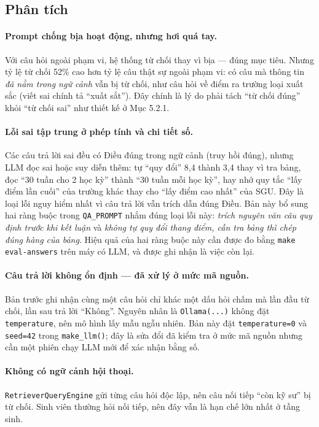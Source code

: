 \subsection{Phân tích}

\paragraph{Prompt chống bịa hoạt động, nhưng hơi quá tay.} Với câu hỏi ngoài phạm vi, hệ thống từ chối
thay vì bịa --- đúng mục tiêu. Nhưng tỷ lệ từ chối 52\% cao hơn tỷ lệ câu thật sự ngoài phạm vi: có
câu mà thông tin \emph{đã nằm trong ngữ cảnh} vẫn bị từ chối, như câu hỏi về điểm ra trường loại xuất
sắc (viết sai chính tả ``xuất sắt''). Đây chính là lý do phải tách ``từ chối đúng'' khỏi ``từ chối
sai'' như thiết kế ở Mục 5.2.1.

\paragraph{Lỗi sai tập trung ở phép tính và chi tiết số.} Các câu trả lời sai đều có Điều đúng trong
ngữ cảnh (truy hồi đúng), nhưng LLM đọc sai hoặc suy diễn thêm: tự ``quy đổi'' 8,4 thành 3,4 thay vì
tra bảng, đọc ``30 tuần cho 2 học kỳ'' thành ``30 tuần mỗi học kỳ'', hay nhớ quy tắc ``lấy điểm lần
cuối'' của trường khác thay cho ``lấy điểm cao nhất'' của SGU. Đây là loại lỗi nguy hiểm nhất vì câu
trả lời vẫn trích dẫn đúng Điều. Bản này bổ sung hai ràng buộc trong \texttt{QA\_PROMPT} nhắm đúng
loại lỗi này: \emph{trích nguyên văn câu quy định trước khi kết luận} và \emph{không tự quy đổi thang
điểm, cần tra bảng thì chép đúng hàng của bảng}. Hiệu quả của hai ràng buộc này cần được đo bằng
\texttt{make eval-answers} trên máy có LLM, và được ghi nhận là việc còn lại.

\paragraph{Câu trả lời không ổn định --- đã xử lý ở mức mã nguồn.} Bản trước ghi nhận cùng một câu hỏi
chỉ khác một dấu hỏi chấm mà lần đầu từ chối, lần sau trả lời ``Không''. Nguyên nhân là
\texttt{Ollama(...)} không đặt \texttt{temperature}, nên mô hình lấy mẫu ngẫu nhiên. Bản này đặt
\texttt{temperature=0} và \texttt{seed=42} trong \texttt{make\_llm()}; đây là sửa đổi đã kiểm tra ở
mức mã nguồn nhưng cần một phiên chạy LLM mới để xác nhận bằng số.

\paragraph{Không có ngữ cảnh hội thoại.} \texttt{RetrieverQueryEngine} gửi từng câu hỏi độc lập, nên
câu nối tiếp ``còn kỹ sư'' bị từ chối. Sinh viên thường hỏi nối tiếp, nên đây vẫn là hạn chế lớn nhất
ở tầng sinh.


